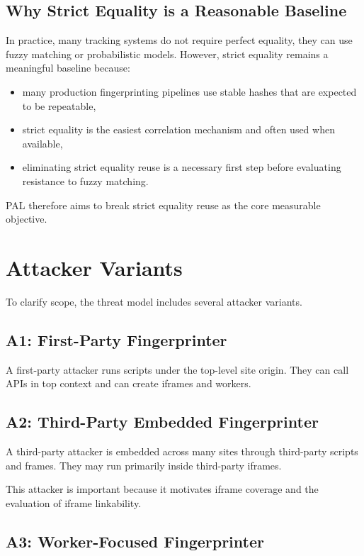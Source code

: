 \documentclass[11pt]{report}
\begin{document}
\subsection{Why Strict Equality is a Reasonable Baseline}

In practice, many tracking systems do not require perfect equality, they can use fuzzy matching or probabilistic models. However, strict equality remains a meaningful baseline because:

\begin{itemize}
    \item many production fingerprinting pipelines use stable hashes that are expected to be repeatable,
    \item strict equality is the easiest correlation mechanism and often used when available,
    \item eliminating strict equality reuse is a necessary first step before evaluating resistance to fuzzy matching.
\end{itemize}

PAL therefore aims to break strict equality reuse as the core measurable objective.

\section{Attacker Variants}

To clarify scope, the threat model includes several attacker variants.

\subsection{A1: First-Party Fingerprinter}

A first-party attacker runs scripts under the top-level site origin. They can call APIs in top context and can create iframes and workers.

\subsection{A2: Third-Party Embedded Fingerprinter}

A third-party attacker is embedded across many sites through third-party scripts and frames. They may run primarily inside third-party iframes.

This attacker is important because it motivates iframe coverage and the evaluation of iframe linkability.

\subsection{A3: Worker-Focused Fingerprinter}
\end{document}
